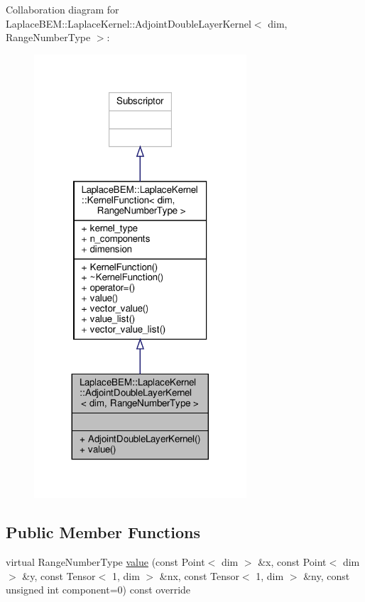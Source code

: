 Collaboration diagram for Laplace\+B\+EM\+:\+:Laplace\+Kernel\+:\+:Adjoint\+Double\+Layer\+Kernel$<$ dim, Range\+Number\+Type $>$\+:\nopagebreak
\begin{figure}[H]
\begin{center}
\leavevmode
\includegraphics[width=224pt]{classLaplaceBEM_1_1LaplaceKernel_1_1AdjointDoubleLayerKernel__coll__graph}
\end{center}
\end{figure}
\subsection*{Public Member Functions}
\begin{DoxyCompactItemize}
\item 
virtual Range\+Number\+Type \hyperlink{classLaplaceBEM_1_1LaplaceKernel_1_1AdjointDoubleLayerKernel_acfa06279ea767680f2fbefee07a34304}{value} (const Point$<$ dim $>$ \&x, const Point$<$ dim $>$ \&y, const Tensor$<$ 1, dim $>$ \&nx, const Tensor$<$ 1, dim $>$ \&ny, const unsigned int component=0) const override
\end{DoxyCompactItemize}
